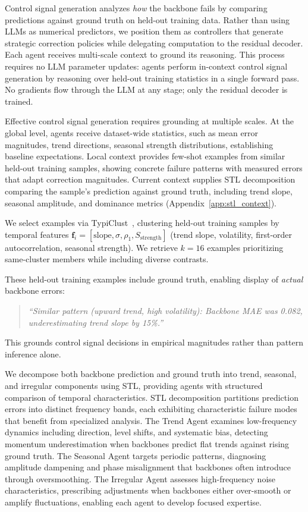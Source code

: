 Control signal generation analyzes \emph{how} the backbone fails by comparing predictions against ground truth on held-out training data. 
Rather than using LLMs as numerical predictors, we position them as controllers that generate strategic correction policies while delegating computation to the residual decoder. Each agent receives multi-scale context to ground its reasoning.
This process requires no LLM parameter updates: agents perform in-context control signal generation by reasoning over held-out training statistics in a single forward pass. No gradients flow through the LLM at any stage; only the residual decoder is trained.

Effective control signal generation requires grounding at multiple scales. At the global level, agents receive dataset-wide statistics, such as mean error magnitudes, trend directions, seasonal strength distributions, establishing baseline expectations. Local context provides few-shot examples from similar held-out training samples, showing concrete failure patterns with measured errors that adapt correction magnitudes. 
Current context supplies STL decomposition comparing the sample's prediction against ground truth, including trend slope, seasonal amplitude, and dominance metrics (Appendix~\ref{app:stl_context}).


We select examples via TypiClust~\cite{hacohen2022active}, clustering held-out training samples by temporal features $\mathbf{f}_i = [\text{slope}, \sigma, \rho_1, S_{\text{strength}}]$ (trend slope, volatility, first-order autocorrelation, seasonal strength). We retrieve $k=16$ examples prioritizing same-cluster members while including diverse contrasts.

These held-out training examples include ground truth, enabling display of \emph{actual} backbone errors:
\begin{quote}
\small
\textit{``Similar pattern (upward trend, high volatility): Backbone MAE was 0.082, underestimating trend slope by 15\%.''}
\end{quote}
This grounds control signal decisions in empirical magnitudes rather than pattern inference alone.

We decompose both backbone prediction and ground truth into trend, seasonal, and irregular components using STL, providing agents with structured comparison of temporal characteristics.
STL decomposition partitions prediction errors into distinct frequency bands, each exhibiting characteristic failure modes that benefit from specialized analysis. The {Trend Agent} examines low-frequency dynamics including direction, level shifts, and systematic bias, detecting momentum underestimation when backbones predict flat trends against rising ground truth. The {Seasonal Agent} targets periodic patterns, diagnosing amplitude dampening and phase misalignment that backbones often introduce through oversmoothing. The {Irregular Agent} assesses high-frequency noise characteristics, prescribing adjustments when backbones either over-smooth or amplify fluctuations, enabling each agent to develop focused expertise. %

